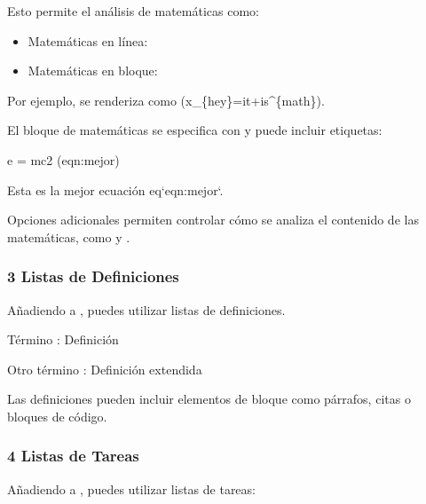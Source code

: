 \documentclass[a4paper,10pt,oneside,spanish,openany]{sphinxmanual}
\begin{document}
\sphinxAtStartPar
Esto permite el análisis de matemáticas como:
\begin{itemize}
\item {} 
\sphinxAtStartPar
Matemáticas en línea: 

\item {} 
\sphinxAtStartPar
Matemáticas en bloque: 

\end{itemize}

\sphinxAtStartPar
Por ejemplo,  se renderiza como (x\_\{hey\}=it+is\textasciicircum{}\{math\}).

\sphinxAtStartPar
El bloque de matemáticas se especifica con \sphinxcode{\sphinxupquote{\$\$}} y puede incluir etiquetas:

\begin{sphinxVerbatim}[commandchars=\\\{\}]
\PYGZdl{}\PYGZdl{}
e = mc\PYGZca{}2
\PYGZdl{}\PYGZdl{} (eqn:mejor)

Esta es la mejor ecuación \PYGZob{}eq\PYGZcb{}`eqn:mejor`.
\end{sphinxVerbatim}

\sphinxAtStartPar
Opciones adicionales permiten controlar cómo se analiza el contenido de las matemáticas, como  y .


\subsubsection{3 Listas de Definiciones}
\label{\detokenize{configuracion_inicial/013.guia_de_myst_parser:listas-de-definiciones}}
\sphinxAtStartPar
Añadiendo  a , puedes utilizar listas de definiciones.

\begin{sphinxVerbatim}[commandchars=\\\{\}]
Término
: Definición

Otro término
: Definición extendida
\end{sphinxVerbatim}

\sphinxAtStartPar
Las definiciones pueden incluir elementos de bloque como párrafos, citas o bloques de código.


\subsubsection{4 Listas de Tareas}
\label{\detokenize{configuracion_inicial/013.guia_de_myst_parser:listas-de-tareas}}
\sphinxAtStartPar
Añadiendo  a , puedes utilizar listas de tareas:
\end{document}
